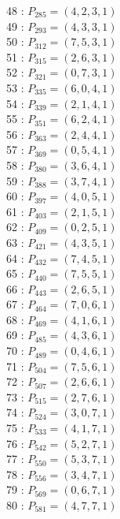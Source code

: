 \documentclass{article}
\begin{document}
{\begin{multicols}{3}
48 : $P_{285}=( 4, 2, 3, 1 )$\\
49 : $P_{293}=( 4, 3, 3, 1 )$\\
50 : $P_{312}=( 7, 5, 3, 1 )$\\
51 : $P_{315}=( 2, 6, 3, 1 )$\\
52 : $P_{321}=( 0, 7, 3, 1 )$\\
53 : $P_{335}=( 6, 0, 4, 1 )$\\
54 : $P_{339}=( 2, 1, 4, 1 )$\\
55 : $P_{351}=( 6, 2, 4, 1 )$\\
56 : $P_{363}=( 2, 4, 4, 1 )$\\
57 : $P_{369}=( 0, 5, 4, 1 )$\\
58 : $P_{380}=( 3, 6, 4, 1 )$\\
59 : $P_{388}=( 3, 7, 4, 1 )$\\
60 : $P_{397}=( 4, 0, 5, 1 )$\\
61 : $P_{403}=( 2, 1, 5, 1 )$\\
62 : $P_{409}=( 0, 2, 5, 1 )$\\
63 : $P_{421}=( 4, 3, 5, 1 )$\\
64 : $P_{432}=( 7, 4, 5, 1 )$\\
65 : $P_{440}=( 7, 5, 5, 1 )$\\
66 : $P_{443}=( 2, 6, 5, 1 )$\\
67 : $P_{464}=( 7, 0, 6, 1 )$\\
68 : $P_{469}=( 4, 1, 6, 1 )$\\
69 : $P_{485}=( 4, 3, 6, 1 )$\\
70 : $P_{489}=( 0, 4, 6, 1 )$\\
71 : $P_{504}=( 7, 5, 6, 1 )$\\
72 : $P_{507}=( 2, 6, 6, 1 )$\\
73 : $P_{515}=( 2, 7, 6, 1 )$\\
74 : $P_{524}=( 3, 0, 7, 1 )$\\
75 : $P_{533}=( 4, 1, 7, 1 )$\\
76 : $P_{542}=( 5, 2, 7, 1 )$\\
77 : $P_{550}=( 5, 3, 7, 1 )$\\
78 : $P_{556}=( 3, 4, 7, 1 )$\\
79 : $P_{569}=( 0, 6, 7, 1 )$\\
80 : $P_{581}=( 4, 7, 7, 1 )$\\
\end{multicols}


%


%


}%
\end{document}
